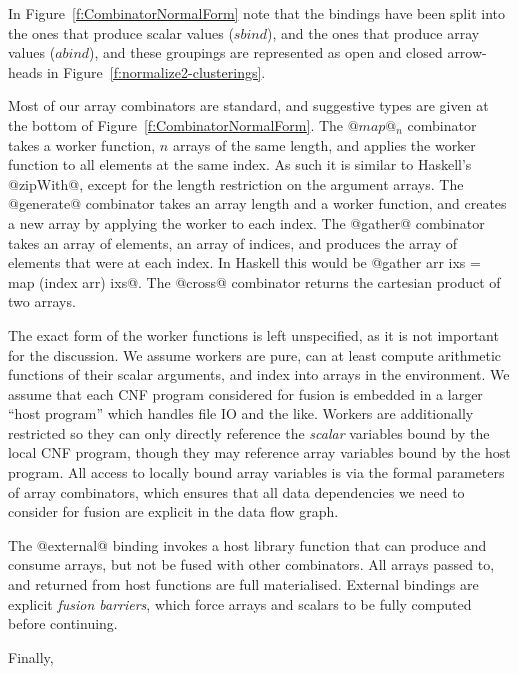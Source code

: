 In Figure~\ref{f:CombinatorNormalForm} note that the bindings have been split into the ones that produce scalar values ($sbind$), and the ones that produce array values ($abind$), and these groupings are represented as open and closed arrow-heads in Figure~\ref{f:normalize2-clusterings}.

Most of our array combinators are standard, and suggestive types are given at the bottom of Figure~\ref{f:CombinatorNormalForm}. The $@map@_n$ combinator takes a worker function, $n$ arrays of the same length, and applies the worker function to all elements at the same index. As such it is similar to Haskell's @zipWith@, except for the length restriction on the argument arrays. The @generate@ combinator takes an array length and a worker function, and creates a new array by applying the worker to each index. The @gather@ combinator takes an array of elements, an array of indices, and produces the array of elements that were at each index. In Haskell this would be @gather arr ixs = map (index arr) ixs@. The @cross@ combinator returns the cartesian product of two arrays. 

The exact form of the worker functions is left unspecified, as it is not important for the discussion. We assume workers are pure, can at least compute arithmetic functions of their scalar arguments, and index into arrays in the environment. We assume that each CNF program considered for fusion is embedded in a larger ``host program'' which handles file IO and the like. Workers are additionally restricted so they can only directly reference the \emph{scalar} variables bound by the local CNF program, though they may reference array variables bound by the host program. All access to locally bound array variables is via the formal parameters of array combinators, which ensures that all data dependencies we need to consider for fusion are explicit in the data flow graph.

The @external@ binding invokes a host library function that can produce and consume arrays, but not be fused with other combinators. All arrays passed to, and returned from host functions are full materialised. External bindings are explicit \emph{fusion barriers}, which force arrays and scalars to be fully computed before continuing. 

Finally,  




